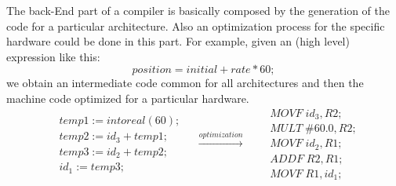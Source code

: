 The back-End part of a compiler is basically composed by the generation of the code for a particular architecture. Also an optimization process for the specific hardware could be done in this part.
\newline
For example, given an (high level) expression like this:
\[
position = initial + rate * 60;
\]
we obtain an intermediate code common for all architectures and then the machine code optimized for a particular hardware.
\[
\left.
\begin{aligned}
&temp1	:=	intoreal(60);\\
&temp2	:=	id_3 + temp1;\\
&temp3	:=	id_2 + temp2;\\
&id_1	:=	temp3;
\end{aligned}
\quad
\xrightarrow{\textit{optimization}}
\quad
\begin{aligned}
&MOVF\;id_3, R2;\\
&MULT\;\#60.0, R2;\\
&MOVF\;id_2, R1;\\
&ADDF\;R2, R1;\\
&MOVF\;R1, id_1;
\end{aligned}
\right.
\]